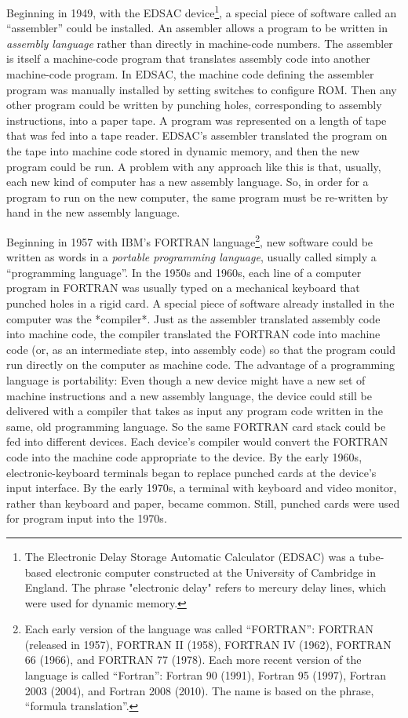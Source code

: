 \documentclass[twocolumn]{book}
\begin{document}
Beginning in 1949, with the EDSAC device\footnote{%
   The Electronic Delay Storage Automatic Calculator (EDSAC) was a tube-based
   electronic computer constructed at the University of Cambridge in England.
   The phrase "electronic delay" refers to mercury delay lines, which were used
   for dynamic memory.},
a special piece of software called an ``assembler'' could be installed.  An
assembler allows a program to be written in \emph{assembly language} rather
than directly in machine-code numbers.  The assembler is itself a machine-code
program that translates assembly code into another machine-code program.  In
EDSAC, the machine code defining the assembler program was manually installed
by setting switches to configure ROM.  Then any other program could be written
by punching holes, corresponding to assembly instructions, into a paper tape.
A program was represented on a length of tape that was fed into a tape reader.
EDSAC's assembler translated the program on the tape into machine code stored
in dynamic memory, and then the new program could be run.  A problem with any
approach like this is that, usually, each new kind of computer has a new
assembly language.  So, in order for a program to run on the new computer, the
same program must be re-written by hand in the new assembly language.

Beginning in 1957 with IBM's FORTRAN language\footnote{%
   Each early version of the language was called ``FORTRAN'': FORTRAN (released
   in 1957), FORTRAN II (1958), FORTRAN IV (1962), FORTRAN 66 (1966), and
   FORTRAN 77 (1978).  Each more recent version of the language is called
   ``Fortran'': Fortran 90 (1991), Fortran 95 (1997), Fortran 2003 (2004), and
   Fortran 2008 (2010).  The name is based on the phrase, ``formula
   translation''.},
new software could be written as words in a \emph{portable programming
language}, usually called simply a ``programming language''.  In the 1950s and
1960s, each line of a computer program in FORTRAN was usually typed on a
mechanical keyboard that punched holes in a rigid card.  A special piece of
software already installed in the computer was the *compiler*.  Just as the
assembler translated assembly code into machine code, the compiler translated
the FORTRAN code into machine code (or, as an intermediate step, into assembly
code) so that the program could run directly on the computer as machine code.
The advantage of a programming language is portability: Even though a new
device might have a new set of machine instructions and a new assembly
language, the device could still be delivered with a compiler that takes as
input any program code written in the same, old programming language.  So the
same FORTRAN card stack could be fed into different devices.  Each device's
compiler would convert the FORTRAN code into the machine code appropriate to
the device.  By the early 1960s, electronic-keyboard terminals began to replace
punched cards at the device's input interface. By the early 1970s, a terminal
with keyboard and video monitor, rather than keyboard and paper, became common.
Still, punched cards were used for program input into the 1970s.
\end{document}
